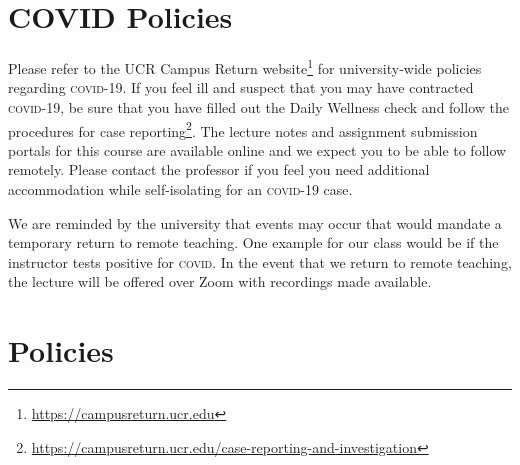 \documentclass[12pt]{article}
\newcommand{\acro}[1]{\textsc{\MakeLowercase{#1}}}
\numberwithin{equation}{section}    %
\begin{document}
\section*{COVID Policies}

Please refer to the UCR Campus Return website\footnote{\url{https://campusreturn.ucr.edu}} for university-wide policies regarding \acro{COVID-19}. If you feel ill and suspect that you may have contracted \acro{COVID-19}, be sure that you have filled out the Daily Wellness check and follow the procedures for case reporting\footnote{\url{https://campusreturn.ucr.edu/case-reporting-and-investigation}}. The lecture notes and assignment submission portals for this course are available online and we expect you to be able to follow remotely. Please contact the professor if you feel you need additional accommodation while self-isolating for an \acro{COVID-19} case.

We are reminded by the university that events may occur that would mandate a temporary return to remote teaching. One example for our class would be if the instructor tests positive for \acro{COVID}. In the event that we return to remote teaching, the lecture will be offered over Zoom with recordings made available. 


\section*{Policies}
\end{document}
